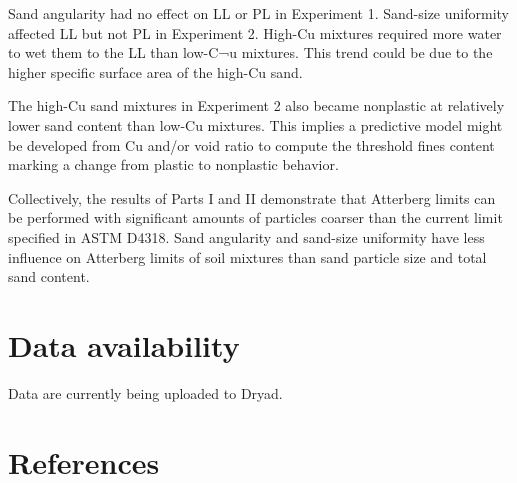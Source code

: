 \documentclass[
  letterpaper,
]{article}
\begin{document}
Sand angularity had no effect on LL or PL in Experiment 1.
Sand-size uniformity affected LL but not PL in Experiment 2. High-Cu mixtures required more water to wet them to the LL than low-C¬u mixtures.
This trend could be due to the higher specific surface area of the high-Cu sand.

The high-Cu sand mixtures in Experiment 2 also became nonplastic at relatively lower sand content than low-Cu mixtures.
This implies a predictive model might be developed from Cu and/or void ratio to compute the threshold fines content marking a change from plastic to nonplastic behavior.

Collectively, the results of Parts I and II demonstrate that Atterberg limits can be performed with significant amounts of particles coarser than the current limit specified in ASTM D4318.
Sand angularity and sand-size uniformity have less influence on Atterberg limits of soil mixtures than sand particle size and total sand content.

\hypertarget{data-availability}{%
\section{Data availability}\label{data-availability}}

Data are currently being uploaded to Dryad.

\hypertarget{references}{%
\section*{References}\label{references}}
\end{document}
